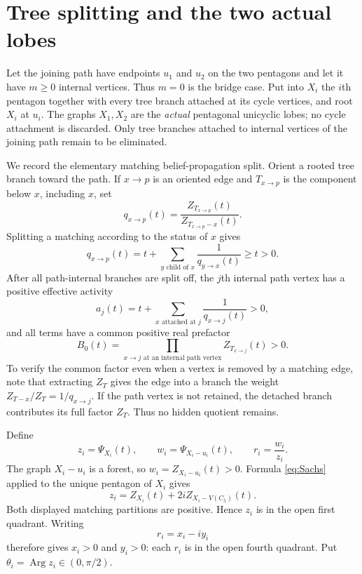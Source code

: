 \documentclass[11pt]{article}
\theoremstyle{remark}
\newcommand{\Arg}{\operatorname{Arg}}
\begin{document}
\section{Tree splitting and the two actual lobes}

Let the joining path have endpoints $u_1$ and $u_2$ on the two pentagons and
let it have $m\geq0$ internal vertices.  Thus $m=0$ is the bridge case.  Put
into $X_i$ the $i$th pentagon together with every tree branch attached at its
cycle vertices, and root $X_i$ at $u_i$.  The graphs $X_1,X_2$ are the
\emph{actual} pentagonal unicyclic lobes; no cycle attachment is discarded.
Only tree branches attached to internal vertices of the joining path remain
to be eliminated.

We record the elementary matching belief-propagation split.  Orient a rooted
tree branch toward the path.  If $x\to p$ is an oriented edge and $T_{x\to p}$
is the component below $x$, including $x$, set
\begin{equation}\label{eq:message}
 q_{x\to p}(t)=\frac{Z_{T_{x\to p}}(t)}{Z_{T_{x\to p}-x}(t)}.
\end{equation}
Splitting a matching according to the status of $x$ gives
\begin{equation}\label{eq:BP}
 q_{x\to p}(t)=t+
 \sum_{y\text{ child of }x}\frac1{q_{y\to x}(t)}\geq t>0.
\end{equation}
After all path-internal branches are split off, the $j$th internal path
vertex has a positive effective activity
\begin{equation}\label{eq:activity}
 a_j(t)=t+\sum_{x\text{ attached at }j}\frac1{q_{x\to j}(t)}>0,
\end{equation}
and all terms have a common positive real prefactor
\begin{equation}\label{eq:B0}
 B_0(t)=\prod_{x\to j\text{ at an internal path vertex}}
 Z_{T_{x\to j}}(t)>0.
\end{equation}
To verify the common factor even when a vertex is removed by a matching edge,
note that extracting $Z_T$ gives the edge into a branch the weight
$Z_{T-x}/Z_T=1/q_{x\to j}$.  If the path vertex is not retained, the detached
branch contributes its full factor $Z_T$.  Thus no hidden quotient remains.

Define
\begin{equation}\label{eq:zwr}
 z_i=\Psi_{X_i}(t),
 \qquad
 w_i=\Psi_{X_i-u_i}(t),
 \qquad
 r_i=\frac{w_i}{z_i}.
\end{equation}
The graph $X_i-u_i$ is a forest, so $w_i=Z_{X_i-u_i}(t)>0$.  Formula
\eqref{eq:Sachs} applied to the unique pentagon of $X_i$ gives
\begin{equation}\label{eq:lobe-quadrant}
 z_i=Z_{X_i}(t)+2iZ_{X_i-V(C_5)}(t).
\end{equation}
Both displayed matching partitions are positive.  Hence $z_i$ is in the
open first quadrant.  Writing
\begin{equation}\label{eq:r-coordinates}
 r_i=x_i-iy_i
\end{equation}
therefore gives $x_i>0$ and $y_i>0$: each $r_i$ is in the open fourth
quadrant.  Put $\theta_i=\Arg z_i\in(0,\pi/2)$.
\end{document}

